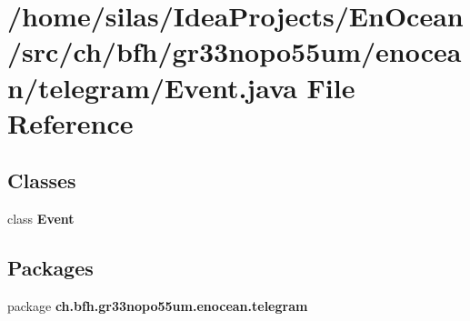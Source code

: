 \section{/home/silas/\+Idea\+Projects/\+En\+Ocean/src/ch/bfh/gr33nopo55um/enocean/telegram/\+Event.java File Reference}
\label{Event_8java}
\subsection*{Classes}
\begin{DoxyCompactItemize}
\item 
class {\bf Event}
\end{DoxyCompactItemize}
\subsection*{Packages}
\begin{DoxyCompactItemize}
\item 
package {\bf ch.\+bfh.\+gr33nopo55um.\+enocean.\+telegram}
\end{DoxyCompactItemize}
